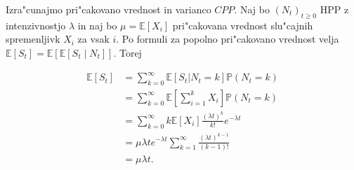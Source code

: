 \documentclass[12pt, a4paper, reqno]{amsart}
\theoremstyle{definition} %
\theoremstyle{plain} %
\newcommand{\E}{\mathbb{E}}
\newcommand{\Prob}{\mathbb{P}}
\newcommand{\1}{\mathds{1}}
\begin{document}
    Izra"cunajmo pri"cakovano vrednost in varianco $CPP$. Naj bo $(N_t)_{t\geq 0}$ HPP z 
    intenzivnostjo $\lambda$ in naj bo $\mu = \E\left[X_i\right]$ pri"cakovana vrednost 
    slu"cajnih spremenljivk $X_i$ za vsak $i$. Po formuli za popolno pri"cakovano vrednost velja 
    $\E\left[S_t\right] = \E\left[\E\left[S_t\mid N_t\right]\right]$. Torej

    \begin{align*}
        \E\left[S_t\right] &= \sum_{k=0}^{\infty} \E\left[S_t | N_t = k\right] \Prob\left(N_t = k\right)\\
                           &= \sum_{k=0}^{\infty} \E\left[\sum_{i=1}^{k} X_i\right] \Prob\left(N_t = k\right)\\
                           &= \sum_{k=0}^{\infty}k\E\left[X_i\right]\frac{(\lambda t)^k}{k!}e^{-\lambda t}\\
                           &= \mu\lambda te^{-\lambda t}\sum_{k=1}^{\infty}\frac{(\lambda t)^{k-1}}{(k-1)!}\\
                           &= \mu\lambda t.
    \end{align*}
\end{document}
